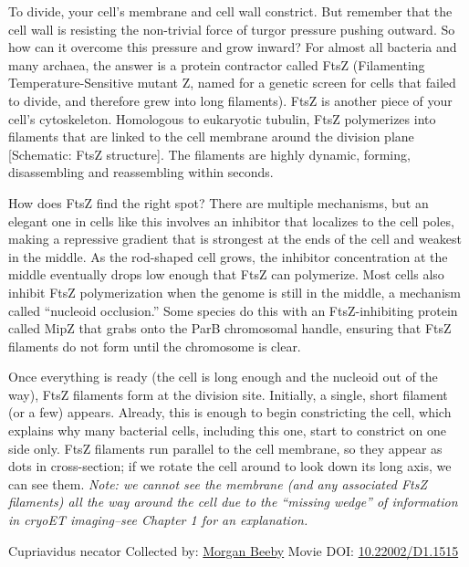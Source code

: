 \documentclass[]{tufte-book}
\begin{document}
To divide, your cell's membrane and cell wall constrict. But remember that the cell wall is resisting the non-trivial force of turgor pressure pushing outward. So how can it overcome this pressure and grow inward? For almost all bacteria and many archaea, the answer is a protein contractor called FtsZ (Filamenting Temperature-Sensitive mutant Z, named for a genetic screen for cells that failed to divide, and therefore grew into long filaments). FtsZ is another piece of your cell's cytoskeleton. Homologous to eukaryotic tubulin, FtsZ polymerizes into filaments that are linked to the cell membrane around the division plane {[}Schematic: FtsZ structure{]}. The filaments are highly dynamic, forming, disassembling and reassembling within seconds.

How does FtsZ find the right spot? There are multiple mechanisms, but an elegant one in cells like this involves an inhibitor that localizes to the cell poles, making a repressive gradient that is strongest at the ends of the cell and weakest in the middle. As the rod-shaped cell grows, the inhibitor concentration at the middle eventually drops low enough that FtsZ can polymerize. Most cells also inhibit FtsZ polymerization when the genome is still in the middle, a mechanism called ``nucleoid occlusion.'' Some species do this with an FtsZ-inhibiting protein called MipZ that grabs onto the ParB chromosomal handle, ensuring that FtsZ filaments do not form until the chromosome is clear.

Once everything is ready (the cell is long enough and the nucleoid out of the way), FtsZ filaments form at the division site. Initially, a single, short filament (or a few) appears. Already, this is enough to begin constricting the cell, which explains why many bacterial cells, including this one, start to constrict on one side only. FtsZ filaments run parallel to the cell membrane, so they appear as dots in cross-section; if we rotate the cell around to look down its long axis, we can see them. \emph{Note: we cannot see the membrane (and any associated FtsZ filaments) all the way around the cell due to the ``missing wedge'' of information in cryoET imaging--see Chapter 1 for an explanation.}



\hypertarget{htmlwidget-65d608937477f6529fc9}{}

\label{fig:5-9}Cupriavidus necator Collected by: \protect\hyperlink{morgan_beeby}{Morgan Beeby} Movie DOI: \href{https://doi.org/10.22002/D1.1515}{10.22002/D1.1515}
\end{document}
